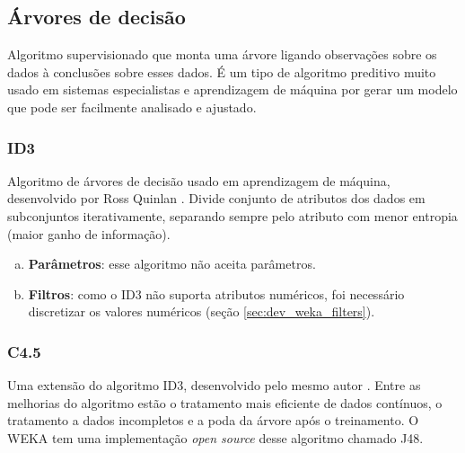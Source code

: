 \subsection{Árvores de decisão}

Algoritmo supervisionado que monta uma árvore ligando observações sobre os dados à conclusões sobre esses dados. É um tipo de algoritmo preditivo muito usado em sistemas especialistas e aprendizagem de máquina por gerar um modelo que pode ser facilmente analisado e ajustado.

\subsubsection{ID3}

Algoritmo de árvores de decisão usado em aprendizagem de máquina, desenvolvido por Ross Quinlan \cite{Quinlan1986}. Divide conjunto de atributos dos dados em subconjuntos iterativamente, separando sempre pelo atributo com menor entropia (maior ganho de informação).

\begin{enumerate}[a)]
    \item \textbf{Parâmetros}: esse algoritmo não aceita parâmetros.
    \item \textbf{Filtros}: como o ID3 não suporta atributos numéricos, foi necessário discretizar os valores numéricos (seção \ref{sec:dev_weka_filters}).
\end{enumerate}

\subsubsection{C4.5}

Uma extensão do algoritmo ID3, desenvolvido pelo mesmo autor \cite{Quinlan1993}. Entre as melhorias do algoritmo estão o tratamento mais eficiente de dados contínuos, o tratamento a dados incompletos e a poda da árvore após o treinamento. O WEKA tem uma implementação \emph{open source} desse algoritmo chamado J48.

